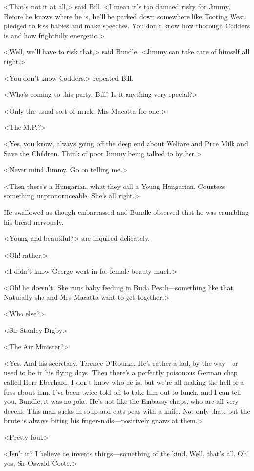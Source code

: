 <That's not it at all,> said Bill. <I mean it's too damned risky for Jimmy. Before he knows where he is, he'll be parked down somewhere like Tooting West, pledged to kiss babies and make speeches. You don't know how thorough Codders is and how frightfully energetic.>

<Well, we'll have to risk that,> said Bundle. <Jimmy can take care of himself all right.>

<You don't know Codders,> repeated Bill.

<Who's coming to this party, Bill? Is it anything very special?>

<Only the usual sort of muck. Mrs Macatta for one.>

<The M.P.?>

<Yes, you know, always going off the deep end about Welfare and Pure Milk and Save the Children. Think of poor Jimmy being talked to by her.>

<Never mind Jimmy. Go on telling me.>

<Then there's a Hungarian, what they call a Young Hungarian. Countess something unpronounceable. She's all right.>

He swallowed as though embarrassed and Bundle observed that he was crumbling his bread nervously.

<Young and beautiful?> she inquired delicately.

<Oh! rather.>

<I didn't know George went in for female beauty much.>

<Oh! he doesn't. She runs baby feeding in Buda Pesth—something like that. Naturally she and Mrs Macatta want to get together.>

<Who else?>

<Sir Stanley Digby\longdash>

<The Air Minister?>

<Yes. And his secretary, Terence O'Rourke. He's rather a lad, by the way—or used to be in his flying days. Then there's a perfectly poisonous German chap called Herr Eberhard. I don't know who he is, but we're all making the hell of a fuss about him. I've been twice told off to take him out to lunch, and I can tell you, Bundle, it was no joke. He's not like the Embassy chaps, who are all very decent. This man sucks in soup and eats peas with a knife. Not only that, but the brute is always biting his finger-nails—positively gnaws at them.>

<Pretty foul.>

<Isn't it? I believe he invents things—something of the kind. Well, that's all. Oh! yes, Sir Oswald Coote.>

